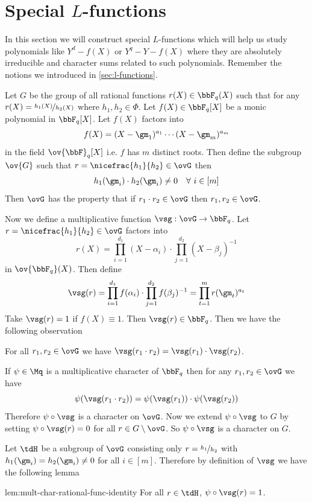 \section{Special $L$-functions}
In this section we will construct special $L$-functions which will help us study polynomials like $Y^d-f(X)$ or $Y^q-Y-f(X)$ where they are absolutely irreducible and character sums related to such polynomials. Remember the notions we introduced in \autoref{sec:l-functions}.

Let $G$ be the group of all rational functions $r(X)\in\bbF_q(X)$ such that for any $r(X)=\nicefrac{h_1(X)}{h_2(X)}$ where $h_1,h_2\in\Phi$. Let $f(X)\in\bbF_q[X]$ be a monic polynomial in $\bbF_q[X]$. Let $f(X)$ factors into $$f(X)=(X-\gm_1)^{a_1}\cdots (X-\gm_m)^{a_m}$$ in the field $\ov{\bbF}_q[X]$ i.e. $f$ has $m$ distinct roots. Then define the subgroup $\ov{G}$ such that $r=\nicefrac{h_1}{h_2}\in\ovG$ then $$h_1(\gm_i)\cdot h_2(\gm_i)\neq 0\quad\forall\ i\in[m]$$Then $\ovG$ has the property that if $r_1\cdot r_2\in\ovG$ then $r_1,r_2\in \ovG$. 

Now we define a multiplicative function $\vsg:\ovG\to \bbF_q$. Let $r=\nicefrac{h_1}{h_2}\in\ovG$ factors into $$r(X)=\prod_{i=1}^{d_1}(X-\alpha_i)\cdot \prod_{j=1}^{d_2}(X-\beta_j)^{-1}$$ in $\ov{\bbF_q}(X)$. Then define $$\vsg(r)=\prod_{i=1}^{d_1}f(\alpha_i)\cdot \prod_{j=1}^{d_2}f(\beta_j)^{-1}=\prod_{t=1}^mr(\gm_t)^{a_t}$$Take $\vsg(r)=1$ if $f(X)\equiv 1$. Then $\vsg(r)\in\bbF_q$. Then we have the following observation
\begin{observation}
  For all  $r_1,r_2\in\ovG$ we have $\vsg(r_1\cdot r_2)=\vsg(r_1)\cdot \vsg(r_2)$. 
\end{observation}
If $\psi\in\Mq$ is a multiplicative character of $\bbF_q$ then for any $r_1,r_2\in\ovG$ we have $$\psi(\vsg(r_1\cdot r_2))=\psi(\vsg(r_1))\cdot \psi(\vsg(r_2))$$Therefore $\psi\circ \vsg$ is a character on $\ovG$. Now we extend $\psi\circ\vsg$ to $G$ by setting $\psi\circ\vsg(r)=0$ for all $r\in G\setminus \ovG$. So $\psi\circ \vsg$ is a character on $G$. 

Let $\tdH$ be a subgroup of $\ovG$ consisting only $r=\nicefrac{h_1}{h_2}$ with $h_1(\gm_i)=h_2(\gm_i)\neq 0$ for all $i\in[m]$. Therefore by definition of $\vsg$ we have the following lemma 
\begin{lemma}{}{lem:mult-char-rational-func-identity}
  For all $r\in\tdH$, $\psi\circ \vsg(r)=1$. 
\end{lemma}

